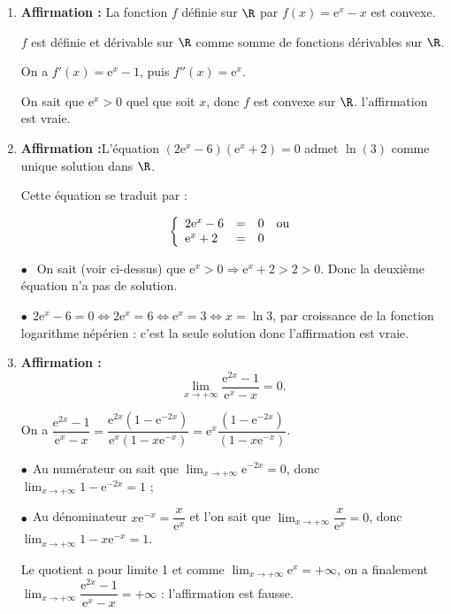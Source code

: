 \medskip

\begin{enumerate}
\item \textbf{Affirmation :} La fonction $f$ définie sur $\R$ par $f(x) = \text{e}^x - x$ est convexe.

$f$ est définie et dérivable sur $\R$ comme somme de fonctions dérivables sur $\R$.

On a $f'(x) = \text{e}^x - 1$, puis $f''(x) = \text{e}^x$.

On sait que $\text{e}^x > 0$ quel que soit $x$, donc $f$ est convexe sur $\R$. l'affirmation est vraie.

\item \textbf{Affirmation :}L'équation $\left(2\text{e}^x - 6\right)\left(\text{e}^x + 2\right) = 0$ admet $\ln (3)$ comme unique solution dans $\R$.

Cette équation se traduit par :

\[\left\{\begin{array}{l c l}
2\text{e}^x - 6&=&0\quad \text{ou}\\
\text{e}^x + 2&=&0
\end{array}\right.\]

$\bullet~~$ On sait (voir ci-dessus) que $\text{e}^x > 0 \Rightarrow \text{e}^x + 2  > 2 > 0 $. Donc la deuxième équation n'a pas de solution.

$\bullet~~$$2\text{e}^x - 6=0 \iff 2\text{e}^x =6 \iff \text{e}^x = 3 \iff x = \ln 3$, par croissance de la fonction logarithme népérien : c'est la seule solution donc l'affirmation est vraie.

\item \textbf{Affirmation :}\[\displaystyle\lim_{x \to + \infty} \dfrac{\text{e}^{2x} - 1}{\text{e}^x - x} = 0.\]

On a $\dfrac{\text{e}^{2x} - 1}{\text{e}^x - x} = \dfrac{\text{e}^{2x}\left(1 - \text{e}^{-2x} \right)}{\text{e}^{x}\left(1 - x\text{e}^{-x} \right)} = \text{e}^{x}\dfrac{\left(1 - \text{e}^{-2x} \right)}{\left(1 - x\text{e}^{-x} \right)}$.

$\bullet~~$Au numérateur on sait que $\displaystyle\lim_{x \to + \infty}\text{e}^{-2x} = 0$, donc $\displaystyle\lim_{x \to + \infty}1 - \text{e}^{-2x} = 1$ ;

$\bullet~~$Au dénominateur $x\text{e}^{-x} = \dfrac{x}{\text{e}^x}$ et l'on sait que $\displaystyle\lim_{x \to + \infty}\dfrac{x}{\text{e}^x} = 0$, donc $\displaystyle\lim_{x \to + \infty}1 - x\text{e}^{-x} = 1$.

Le quotient a pour limite 1 et comme $\displaystyle\lim_{x \to + \infty}\text{e}^{x} = + \infty$, on a finalement $\displaystyle\lim_{x \to + \infty} \dfrac{\text{e}^{2x} - 1}{\text{e}^x - x} = +\infty$ : l'affirmation est fausse.


\end{enumerate}
